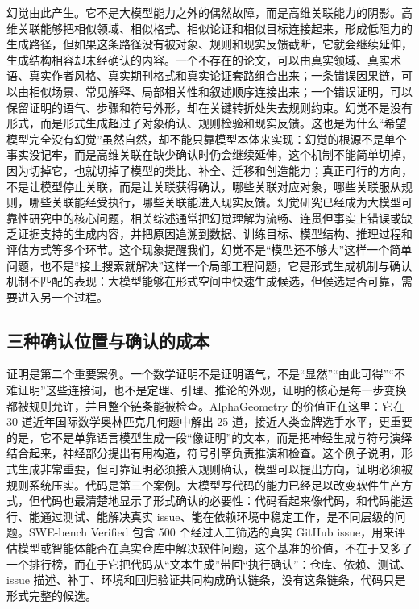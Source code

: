幻觉由此产生。它不是大模型能力之外的偶然故障，而是高维关联能力的阴影。高维关联能够把相似领域、相似格式、相似论证和相似目标连接起来，形成低阻力的生成路径，但如果这条路径没有被对象、规则和现实反馈截断，它就会继续延伸，生成结构相容却未经确认的内容。一个不存在的论文，可以由真实领域、真实术语、真实作者风格、真实期刊格式和真实论证套路组合出来；一条错误因果链，可以由相似场景、常见解释、局部相关性和叙述顺序连接出来；一个错误证明，可以保留证明的语气、步骤和符号外形，却在关键转折处失去规则约束。幻觉不是没有形式，而是形式生成超过了对象确认、规则检验和现实反馈。这也是为什么“希望模型完全没有幻觉”虽然自然，却不能只靠模型本体来实现：幻觉的根源不是单个事实没记牢，而是高维关联在缺少确认时仍会继续延伸，这个机制不能简单切掉，因为切掉它，也就切掉了模型的类比、补全、迁移和创造能力；真正可行的方向，不是让模型停止关联，而是让关联获得确认，哪些关联对应对象，哪些关联服从规则，哪些关联能经受执行，哪些关联能进入现实反馈。幻觉研究已经成为大模型可靠性研究中的核心问题，相关综述通常把幻觉理解为流畅、连贯但事实上错误或缺乏证据支持的生成内容，并把原因追溯到数据、训练目标、模型结构、推理过程和评估方式等多个环节\cite{huang2023hallucination}。这个现象提醒我们，幻觉不是“模型还不够大”这样一个简单问题，也不是“接上搜索就解决”这样一个局部工程问题，它是形式生成机制与确认机制不匹配的表现：大模型能够在形式空间中快速生成候选，但候选是否可靠，需要进入另一个过程。

\subsection{三种确认位置与确认的成本}


证明是第二个重要案例。一个数学证明不是证明语气，不是“显然”“由此可得”“不难证明”这些连接词，也不是定理、引理、推论的外观，证明的核心是每一步变换都被规则允许，并且整个链条能被检查。AlphaGeometry 的价值正在这里：它在 30 道近年国际数学奥林匹克几何题中解出 25 道，接近人类金牌选手水平\cite{trinh2024alphageometry}，更重要的是，它不是单靠语言模型生成一段“像证明”的文本，而是把神经生成与符号演绎结合起来，神经部分提出有用构造，符号引擎负责推演和检查。这个例子说明，形式生成非常重要，但可靠证明必须接入规则确认，模型可以提出方向，证明必须被规则系统压实。代码是第三个案例。大模型写代码的能力已经足以改变软件生产方式，但代码也最清楚地显示了形式确认的必要性：代码看起来像代码，和代码能运行、能通过测试、能解决真实 issue、能在依赖环境中稳定工作，是不同层级的问题。SWE-bench Verified 包含 500 个经过人工筛选的真实 GitHub issue，用来评估模型或智能体能否在真实仓库中解决软件问题\cite{swebench2024}，这个基准的价值，不在于又多了一个排行榜，而在于它把代码从“文本生成”带回“执行确认”：仓库、依赖、测试、issue 描述、补丁、环境和回归验证共同构成确认链条，没有这条链条，代码只是形式完整的候选。


